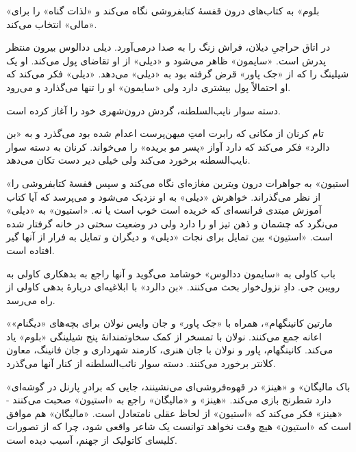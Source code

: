 \documentclass[12pt]{book}
\newcommand{\noun}[1]{«{#1}»}
\begin{document}
    \noun{بلوم} به کتاب‌های درون قفسۀ کتابفروشی نگاه می‌کند و «لذات گناه» را برای \noun{مالی} انتخاب می‌کند.

    در اتاق حراجیِ دیلان، فراش زنگ را به صدا درمی‌آورد. دیلی ددالوس بیرون منتظر پدرش است. \noun{سایمون}  ظاهر می‌شود و \noun{دیلی} از او تقاضای پول می‌کند. او یک شیلینگ را که از \noun{جک پاور} قرض گرفته بود به \noun{دیلی} می‌دهد. \noun{دیلی} فکر می‌کند که او احتمالاً پول بیشتری دارد ولی \noun{سایمون}  او را تنها می‌گذارد و می‌رود.

    دسته سوار نایب‌السلطنه، گردش درون‌شهری خود را آغاز کرده است.

    تام کرنان از مکانی که رابرت امتِ میهن‌پرست اعدام شده بود می‌گذرد و به \noun{بن دالرد}  فکر می‌کند که دارد آواز «پسر مو بریده» را می‌خواند. کرنان به دسته سوار نایب‌السطنه برخورد می‌کند ولی خیلی دیر دست تکان می‌دهد.

    \noun{استیون} به جواهرات درون ویترین مغازه‌ای نگاه می‌کند و سپس قفسۀ کتابفروشی را از نظر می‌گذراند. خواهرش \noun{دیلی} به او نزدیک می‌شود و می‌پرسد که آیا کتاب آموزش مبتدی فرانسه‌ای که خریده است خوب است یا نه. \noun{استیون} به \noun{دیلی} می‌نگرد که چشمان و ذهن تیز او را دارد ولی در وضعیت سختی در خانه گرفتار شده است. \noun{استیون} بین تمایل برای نجات \noun{دیلی} و دیگران و تمایل به فرار از آنها گیر افتاده است.

    باب کاولی به \noun{سایمون ددالوس‬} خوشامد می‌گوید و آنها راجع به بدهکاری کاولی به رویبن جی. دادِ نزول‌خوار بحث می‌کنند. \noun{بن دالرد}  با ابلاغیه‌ای دربارۀ بدهی کاولی از راه می‌رسد.

    \noun{مارتین کانینگهام}، همراه با \noun{جک پاور} و جان وایس نولان برای بچه‌های \noun{دیگنام} اعانه جمع می‌کنند. نولان با تمسخر از کمک سخاوتمندانۀ پنج شیلینگی \noun{بلوم} یاد می‌کند. کانینگهام، پاور و نولان با جان هنری، کارمند شهرداری و جان فانینگ، معاون کلانتر برخورد می‌کنند. دسته سوار نائب‌السلطنه از کنار آنها می‌گذرد.

    \noun{باک مالیگان‬} و \noun{هینز}  در قهوه‌فروشی‌ای می‌نشینند، جایی که برادرِ پارنل در گوشه‌ای دارد شطرنج بازی می‌کند. \noun{هینز}  و \noun{مالیگان} راجع به \noun{استیون} صحبت می‌کنند - \noun{هینز}  فکر می‌کند که \noun{استیون} از لحاظ عقلی نامتعادل است. \noun{مالیگان} هم موافق است که \noun{استیون} هیچ وقت نخواهد توانست یک شاعر واقعی شود، چرا که از تصورات کلیسای کاتولیک از جهنم، آسیب دیده است.
\end{document}

